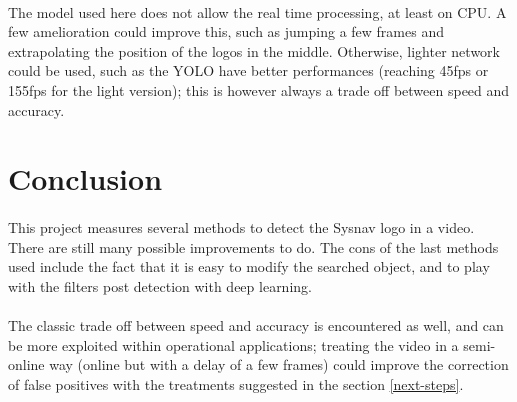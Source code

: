 \documentclass[12pt]{article}%
\begin{document}
\paragraph{}
The model used here does not allow the real time processing, at least on CPU. A few amelioration could improve this, such as jumping a few frames and extrapolating the position of the logos in the middle. Otherwise, lighter network could be used, such as the YOLO \cite{yolo} have better performances (reaching 45fps or 155fps for the light version); this is however always a trade off between speed and accuracy.

\section{Conclusion}
\paragraph{}
This project measures several methods to detect the Sysnav logo in a video. There are still many possible improvements to do. The cons of the last methods used include the fact that it is easy to modify the searched object, and to play with the filters post detection with deep learning.

\paragraph{}
The classic trade off between speed and accuracy is encountered as well, and can be more exploited within operational applications; treating the video in a semi-online way (online but with a delay of a few frames) could improve the correction of false positives with the treatments suggested in the section \ref{next-steps}.
\end{document}
